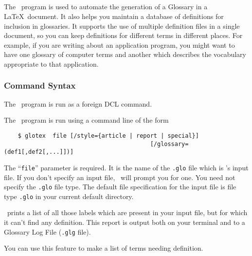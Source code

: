 \subsection{\GloTeX}
\label{se:glotex}

The \GloTeX\ program is used to automate the generation of a Glossary in a
\LaTeX\ document. 
It also helps you maintain a database of definitions for inclusion in 
glossaries.  It supports the use of multiple definition files in a single 
document, so you can keep definitions for different terms in different places.
For example, if you are writing about an application program, you might want
to have one glossary of computer terms and another which describes the
vocabulary appropriate to that application.

\subsubsection{Command Syntax}

The \GloTeX\ program is run as a foreign DCL command.

The \GloTeX\ program is run using a command line of the form

\begin{verbatim}
    $ glotex  file [/style={article | report | special}] 
                                          [/glossary=(def1[,def2[,...]])]
\end{verbatim}

The ``{\tt file}'' parameter 
is required.  It is the name of the {\tt .glo} file
which is \GloTeX 's input file.  If you don't specify an input file, \GloTeX\
will prompt you for one.  You need not specify the {\tt .glo} file type.  The
default file specification for the input file is file type {\tt .glo} in your
current default directory.

\GloTeX\ prints a list of all those labels which are present in your input file,
but for which it can't find any definition.  This report is output both on your
terminal and to a Glossary Log File ({\tt .glg} file).

You can use this feature to make a list of terms needing definition.

